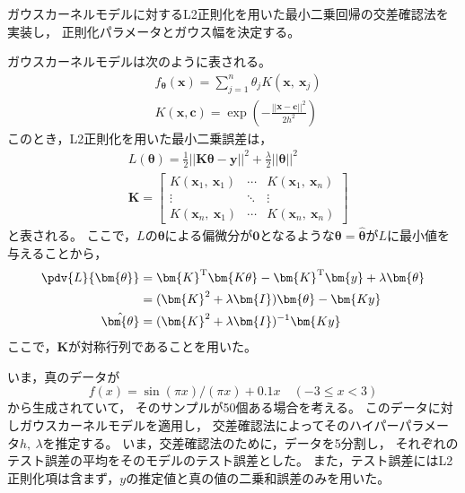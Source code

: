 \documentclass[class=jsarticle, crop=false, dvipdfmx, fleqn]{standalone}
\begin{document}
\section{}

ガウスカーネルモデルに対するL2正則化を用いた最小二乗回帰の交差確認法を実装し，
正則化パラメータとガウス幅を決定する。

ガウスカーネルモデルは次のように表される。
\begin{align}
	& f_{\bm{\theta}} (\bm{x}) = \sum_{j=1}^{n} \theta_j K(\bm{x},\ \bm{x}_j) \\
	& K(\bm{x}, \bm{c}) = \exp(-\frac{||\bm{x} - \bm{c}||^2}{2 h^2})
\end{align}
このとき，L2正則化を用いた最小二乗誤差は，
\begin{align}
	& L(\bm{\theta}) = \frac{1}{2} ||\bm{K \theta} - \bm{y}||^2 + \frac{\lambda}{2} ||\bm{\theta}||^2 \\
	& \bm{K} =
		\begin{bmatrix}
			K(\bm{x}_1,\ \bm{x}_1) & \cdots & K(\bm{x}_1,\ \bm{x}_n) \\
			\vdots & \ddots & \vdots \\
			K(\bm{x}_n,\ \bm{x}_1) & \cdots & K(\bm{x}_n,\ \bm{x}_n)
		\end{bmatrix}
\end{align}
と表される。
ここで，$L$の$\bm{\theta}$による偏微分が$\bm{0}$となるような$\bm{\theta} = \hat{\bm{\theta}}$が$L$に最小値を与えることから，
\begin{align}
	\pdv{L}{\bm{\theta}}
		& = \bm{K}^\mathrm{T} \bm{K \theta} - \bm{K}^\mathrm{T} \bm{y} + \lambda \bm{\theta} \\
		& = (\bm{K}^2 + \lambda \bm{I}) \bm{\theta} - \bm{K y} \\
	\hat{\bm{\theta}} & = (\bm{K}^2 + \lambda \bm{I})^{-1} \bm{K y}
\end{align}
ここで，$\bm{K}$が対称行列であることを用いた。

いま，真のデータが
\begin{equation}
	f(x) = \sin(\pi x) / (\pi x) + 0.1 x
		\quad (-3 \leq x < 3 )
\end{equation}
から生成されていて，
そのサンプルが50個ある場合を考える。
このデータに対しガウスカーネルモデルを適用し，
交差確認法によってそのハイパーパラメータ$h,\ \lambda$を推定する。
いま，交差確認法のために，データを5分割し，
それぞれのテスト誤差の平均をそのモデルのテスト誤差とした。
また，テスト誤差にはL2正則化項は含まず，$y$の推定値と真の値の二乗和誤差のみを用いた。
\end{document}
